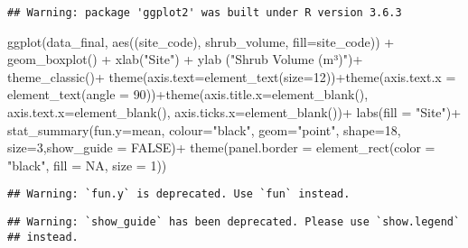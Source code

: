 \documentclass[
]{article}
\newenvironment{Shaded}{\begin{snugshade}}{\end{snugshade}}
\newcommand{\AttributeTok}[1]{\textcolor[rgb]{0.77,0.63,0.00}{#1}}
\newcommand{\ConstantTok}[1]{\textcolor[rgb]{0.00,0.00,0.00}{#1}}
\newcommand{\DecValTok}[1]{\textcolor[rgb]{0.00,0.00,0.81}{#1}}
\newcommand{\FunctionTok}[1]{\textcolor[rgb]{0.00,0.00,0.00}{#1}}
\newcommand{\NormalTok}[1]{#1}
\newcommand{\SpecialCharTok}[1]{\textcolor[rgb]{0.00,0.00,0.00}{#1}}
\newcommand{\StringTok}[1]{\textcolor[rgb]{0.31,0.60,0.02}{#1}}
\begin{document}
\begin{verbatim}
## Warning: package 'ggplot2' was built under R version 3.6.3
\end{verbatim}

\begin{Shaded}
\begin{Highlighting}[]
\FunctionTok{ggplot}\NormalTok{(data\_final, }\FunctionTok{aes}\NormalTok{((site\_code), shrub\_volume, }\AttributeTok{fill=}\NormalTok{site\_code)) }\SpecialCharTok{+} \FunctionTok{geom\_boxplot}\NormalTok{() }\SpecialCharTok{+} \FunctionTok{xlab}\NormalTok{(}\StringTok{"Site"}\NormalTok{) }\SpecialCharTok{+} \FunctionTok{ylab}\NormalTok{ (}\StringTok{"Shrub Volume (m³)"}\NormalTok{)}\SpecialCharTok{+} \FunctionTok{theme\_classic}\NormalTok{()}\SpecialCharTok{+} \FunctionTok{theme}\NormalTok{(}\AttributeTok{axis.text=}\FunctionTok{element\_text}\NormalTok{(}\AttributeTok{size=}\DecValTok{12}\NormalTok{))}\SpecialCharTok{+}\FunctionTok{theme}\NormalTok{(}\AttributeTok{axis.text.x =} \FunctionTok{element\_text}\NormalTok{(}\AttributeTok{angle =} \DecValTok{90}\NormalTok{))}\SpecialCharTok{+}\FunctionTok{theme}\NormalTok{(}\AttributeTok{axis.title.x=}\FunctionTok{element\_blank}\NormalTok{(),}
        \AttributeTok{axis.text.x=}\FunctionTok{element\_blank}\NormalTok{(),}
        \AttributeTok{axis.ticks.x=}\FunctionTok{element\_blank}\NormalTok{())}\SpecialCharTok{+} \FunctionTok{labs}\NormalTok{(}\AttributeTok{fill =} \StringTok{"Site"}\NormalTok{)}\SpecialCharTok{+} \FunctionTok{stat\_summary}\NormalTok{(}\AttributeTok{fun.y=}\NormalTok{mean, }\AttributeTok{colour=}\StringTok{"black"}\NormalTok{, }\AttributeTok{geom=}\StringTok{"point"}\NormalTok{, }\AttributeTok{shape=}\DecValTok{18}\NormalTok{, }\AttributeTok{size=}\DecValTok{3}\NormalTok{,}\AttributeTok{show\_guide =} \ConstantTok{FALSE}\NormalTok{)}\SpecialCharTok{+} \FunctionTok{theme}\NormalTok{(}\AttributeTok{panel.border =} \FunctionTok{element\_rect}\NormalTok{(}\AttributeTok{color =} \StringTok{"black"}\NormalTok{,}
                                    \AttributeTok{fill =} \ConstantTok{NA}\NormalTok{,}
                                    \AttributeTok{size =} \DecValTok{1}\NormalTok{))}
\end{Highlighting}
\end{Shaded}

\begin{verbatim}
## Warning: `fun.y` is deprecated. Use `fun` instead.
\end{verbatim}

\begin{verbatim}
## Warning: `show_guide` has been deprecated. Please use `show.legend`
## instead.
\end{verbatim}
\end{document}

